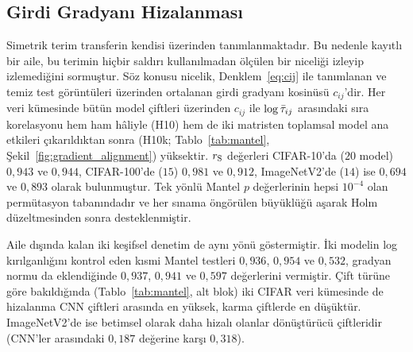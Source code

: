 \subsection{Girdi Gradyanı Hizalanması}
\label{subsec:gradcos}

Simetrik terim transferin kendisi üzerinden tanımlanmaktadır. Bu nedenle kayıtlı bir aile, bu terimin hiçbir saldırı kullanılmadan ölçülen bir niceliği izleyip izlemediğini sormuştur. Söz konusu nicelik, Denklem~\eqref{eq:cij} ile tanımlanan ve temiz test görüntüleri üzerinden ortalanan girdi gradyanı kosinüsü $c_{ij}$'dir. Her veri kümesinde bütün model çiftleri üzerinden $c_{ij}$ ile $\log\bar{\tau}_{ij}$ arasındaki sıra korelasyonu hem ham hâliyle (H10) hem de iki matristen toplamsal model ana etkileri çıkarıldıktan sonra (H10k; Tablo~\ref{tab:mantel}, Şekil~\ref{fig:gradient_alignment}) yüksektir. $r_{\mathrm{S}}$ değerleri CIFAR-10'da ($20$ model) $0{,}943$ ve $0{,}944$, CIFAR-100'de ($15$) $0{,}981$ ve $0{,}912$, ImageNetV2'de ($14$) ise $0{,}694$ ve $0{,}893$ olarak bulunmuştur. Tek yönlü Mantel $p$ değerlerinin hepsi $10^{-4}$ olan permütasyon tabanındadır ve her sınama öngörülen büyüklüğü aşarak Holm düzeltmesinden sonra desteklenmiştir.

Aile dışında kalan iki keşifsel denetim de aynı yönü göstermiştir. İki modelin log kırılganlığını kontrol eden kısmi Mantel testleri $0{,}936$, $0{,}954$ ve $0{,}532$, gradyan normu da eklendiğinde $0{,}937$, $0{,}941$ ve $0{,}597$ değerlerini vermiştir. Çift türüne göre bakıldığında (Tablo~\ref{tab:mantel}, alt blok) iki CIFAR veri kümesinde de hizalanma CNN çiftleri arasında en yüksek, karma çiftlerde en düşüktür. ImageNetV2'de ise betimsel olarak daha hizalı olanlar dönüştürücü çiftleridir (CNN'ler arasındaki $0{,}187$ değerine karşı $0{,}318$).

